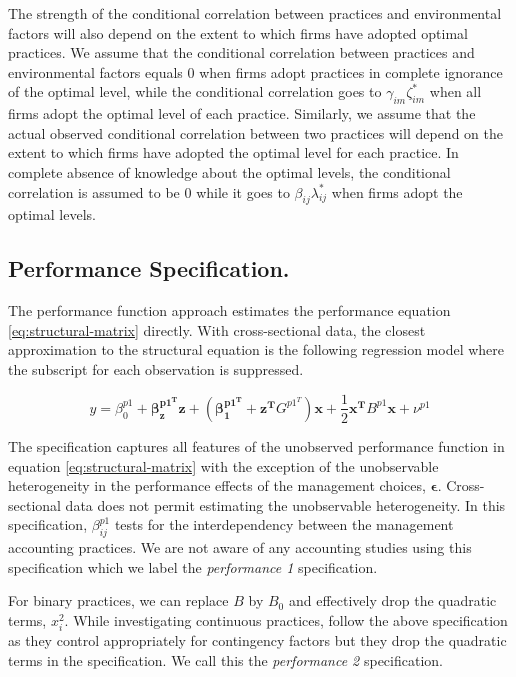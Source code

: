 \documentclass[12pt]{article}
\begin{document}
The strength of the conditional correlation between practices and environmental factors will also depend on the extent to which firms have adopted optimal practices. We assume that the conditional correlation between practices and environmental factors equals $0$ when firms adopt practices in complete ignorance of the optimal level, while the conditional correlation goes to $\gamma_{im}\zeta_{im}^*$ when all firms adopt the optimal level of each practice. Similarly, we assume that the actual observed conditional correlation between two practices will depend on the extent to which firms have adopted the optimal level for each practice. In complete absence of knowledge about the optimal levels, the conditional correlation is assumed to be $0$ while it goes to $\beta_{ij}\lambda_{ij}^*$ when firms adopt the optimal levels. 

\subsection{Performance Specification.}\label{the-performance-specification.}

The performance function approach estimates the performance equation \eqref{eq:structural-matrix} directly. With cross-sectional data, the closest approximation to the structural equation is the following regression model where the subscript for each observation is suppressed. 

\begin{equation*}
    y = \beta_0^{p1} + \mathbf{\beta_z^{p1^T} z} + (\mathbf{\beta_1^{p1^T}} + \mathbf{z^T} G^{p1^T}) \mathbf{x} + 
    \frac{1}{2}\mathbf{x^T} B^{p1} \mathbf{x} + \nu^{p1}
\end{equation*}

The specification captures all features of the unobserved performance function in equation \eqref{eq:structural-matrix} with the exception of the unobservable heterogeneity in the performance effects of the management choices, $\mathbf{\epsilon}$. Cross-sectional data does not permit estimating the unobservable heterogeneity. In this specification, \(\beta_{ij}^{p1}\) tests for the interdependency between the management accounting practices. We are not aware of any accounting studies using this specification which we label the \emph{performance 1} specification. 

For binary practices, we can replace $B$ by $B_0$ and effectively drop the quadratic terms, $x_i^2$.  While investigating continuous practices, \citet{Bedford2016} follow the above specification as they control appropriately for contingency factors but they drop the quadratic terms in the specification. We call this the \emph{performance 2} specification.
\end{document}
